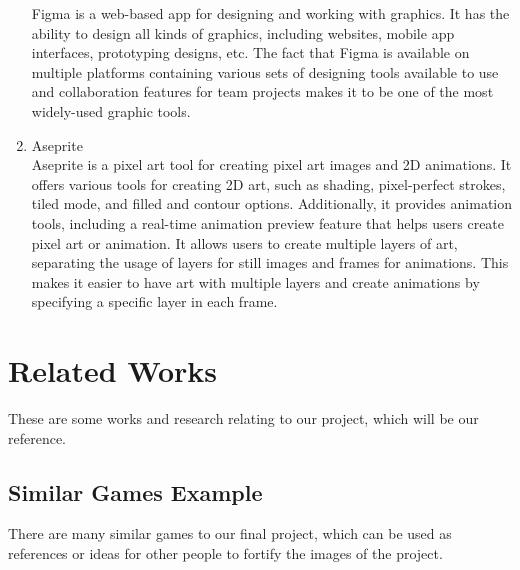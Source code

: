 \documentclass[12pt,oneside,openright,a4paper]{cpe-english-project}
\begin{document}
\begin{enumerate}
	Figma is a web-based app for designing and working with graphics. It has the ability to design all kinds of graphics, including websites, mobile app interfaces, prototyping designs, etc. The fact that Figma is available on multiple platforms containing various sets of designing tools available to use and collaboration features for team projects \cite{daniel2022} makes it to be one of the most widely-used graphic tools.
	\item Aseprite \\
	Aseprite is a pixel art tool for creating pixel art images and 2D animations. It offers various tools for creating 2D art, such as shading, pixel-perfect strokes, tiled mode, and filled and contour options. Additionally, it provides animation tools, including a real-time animation preview feature that helps users create pixel art or animation. It allows users to create multiple layers of art, separating the usage of layers for still images and frames for animations. This makes it easier to have art with multiple layers and create animations by specifying a specific layer in each frame.
\end{enumerate}


\section{Related Works}
These are some works and research relating to our project, which will be our reference.

\subsection{Similar Games Example}
There are many similar games to our final project, which can be used as references or ideas for other people to fortify the images of the project.
\end{document}
